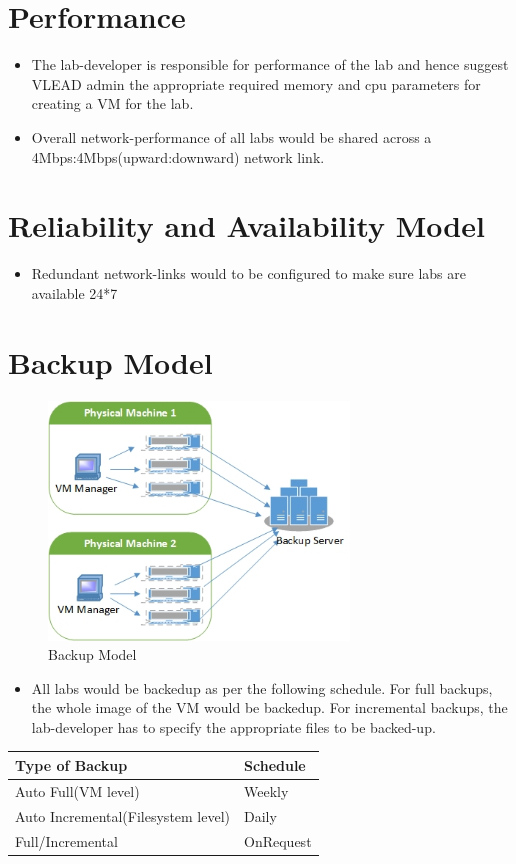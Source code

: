 \documentclass[11pt]{article}
\begin{document}
\section{Performance}
\label{sec-7}

  
\begin{itemize}
\item The lab-developer is responsible for performance of the lab and
    hence suggest VLEAD admin the appropriate required memory and cpu
    parameters for creating a VM for the lab.
\item Overall network-performance of all labs would be shared across a
    4Mbps:4Mbps(upward:downward) network link.
\end{itemize}
\section{Reliability and Availability Model}
\label{sec-8}


\begin{itemize}
\item Redundant network-links would to be configured to make sure labs are
    available 24*7
\end{itemize}
\section{Backup Model}
\label{sec-9}


   \begin{figure}[htb]
\centering
\includegraphics[width=8cm]{backup-model.jpg}
\caption{Backup Model}
\end{figure}

\begin{itemize}
\item All labs would be backedup as per the following schedule. For full
    backups, the whole image of the VM would be backedup. For
    incremental backups, the lab-developer has to specify the
    appropriate files to be backed-up.
\end{itemize}

\begin{center}
\begin{tabular}{ll}
\hline
 Type of Backup                      &  Schedule   \\
\hline
 Auto Full(VM level)                 &  Weekly     \\
 Auto Incremental(Filesystem level)  &  Daily      \\
 Full/Incremental                    &  OnRequest  \\
\hline
\end{tabular}
\end{center}
\end{document}

